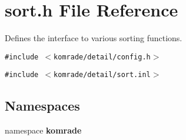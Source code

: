 \section{sort.h File Reference}
\label{sort_8h}
Defines the interface to various sorting functions. 

{\tt \#include $<$komrade/detail/config.h$>$}\par
{\tt \#include $<$komrade/detail/sort.inl$>$}\par
\subsection*{Namespaces}
\begin{CompactItemize}
\item 
namespace {\bf komrade}
\end{CompactItemize}
